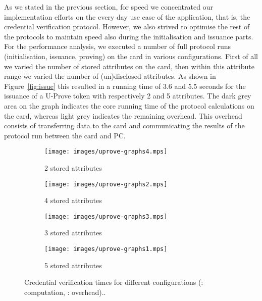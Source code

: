 As we stated in the previous section, for speed we concentrated our
implementation efforts on the every day use case of the application, that is,
the credential verification protocol. However, we also strived to optimise the
rest of the protocols to maintain speed also during the initialisation and
issuance parts. For the performance analysis, we executed a number of full
protocol runs (initialisation, issuance, proving) on the card in various
configurations. First of all we varied the number of stored attributes on the
card, then within this attribute range we varied the number of (un)disclosed
attributes. As shown in Figure~\ref{fig:issue} this resulted in a running time
of 3.6 and 5.5 seconds for the issuance of a U-Prove token with respectively 2
and 5 attributes. The dark grey area on the graph indicates the core running
time of the protocol calculations on the card, whereas light grey indicates the
remaining overhead. This overhead consists of transferring data to the card and
communicating the results of the protocol run between the card and PC.

\begin{figure}[hbt]
  \centering
  \begin{subfigure}[b]{0.45\textwidth}
    \texttt{[image: images/uprove-graphs4.mps]}
    \caption{2 stored attributes}
    \label{fig:2attr}
  \end{subfigure}
  \begin{subfigure}[b]{0.45\textwidth}
    \texttt{[image: images/uprove-graphs2.mps]}
    \caption{4 stored attributes}
    \label{fig:4attr}
  \end{subfigure}

  \begin{subfigure}[b]{0.45\textwidth}
    \texttt{[image: images/uprove-graphs3.mps]}
    \caption{3 stored attributes}
    \label{fig:3attr}
  \end{subfigure}
  \begin{subfigure}[b]{0.45\textwidth}
    \texttt{[image: images/uprove-graphs1.mps]}
    \caption{5 stored attributes}
    \label{fig:5attr}
  \end{subfigure}

  \caption[Credential verification times for different configurations.]{
    Credential verification times for different configurations
    (: computation,
      : overhead)..}
  \label{fig:total}
\end{figure}

